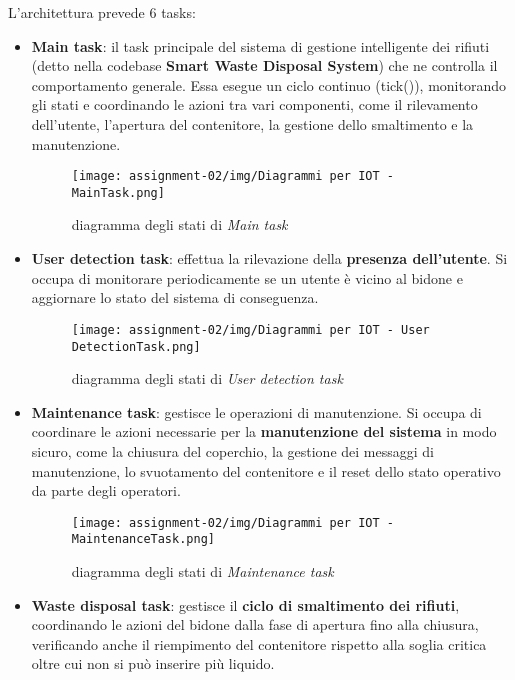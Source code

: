 \documentclass{report}
\begin{document}
\par{
L'architettura prevede 6 tasks: 
}
\begin{itemize}
    \item {
    \textbf{Main task}: il task principale del sistema di gestione intelligente dei rifiuti (detto nella codebase \textbf{Smart Waste Disposal System}) che ne controlla il comportamento generale. Essa esegue un ciclo continuo (tick()), monitorando gli stati e coordinando le azioni tra vari componenti, come il rilevamento dell'utente, l'apertura del contenitore, la gestione dello smaltimento e la manutenzione.
    \begin{figure}[H]
        \centering
        \texttt{[image: assignment-02/img/Diagrammi per IOT - MainTask.png]}
        \caption{diagramma degli stati di \textit{Main task}}
        \label{fig:main-task}
    \end{figure}
    }
    \item {
    \textbf{User detection task}: effettua la rilevazione della \textbf{presenza dell'utente}. Si occupa di monitorare periodicamente se un utente è vicino al bidone e aggiornare lo stato del sistema di conseguenza.
    \begin{figure}[H]
        \centering
        \texttt{[image: assignment-02/img/Diagrammi per IOT - User DetectionTask.png]}
        \caption{diagramma degli stati di \textit{User detection task}}
        \label{fig:detection-task}
    \end{figure}
    }
    \item {
    \textbf{Maintenance task}: gestisce le operazioni di manutenzione. Si occupa di coordinare le azioni necessarie per la \textbf{manutenzione del sistema} in modo sicuro, come la chiusura del coperchio, la gestione dei messaggi di manutenzione, lo svuotamento del contenitore e il reset dello stato operativo da parte degli operatori.
    \begin{figure}[H]
        \centering
        \texttt{[image: assignment-02/img/Diagrammi per IOT - MaintenanceTask.png]}
        \caption{diagramma degli stati di \textit{Maintenance task}}
        \label{fig:maintenance-task}
    \end{figure}
    }
    \item {
    \textbf{Waste disposal task}: gestisce il \textbf{ciclo di smaltimento dei rifiuti}, coordinando le azioni del bidone dalla fase di apertura fino alla chiusura, verificando anche il riempimento del contenitore rispetto alla soglia critica oltre cui non si può inserire più liquido.
}
\end{itemize}
\end{document}
